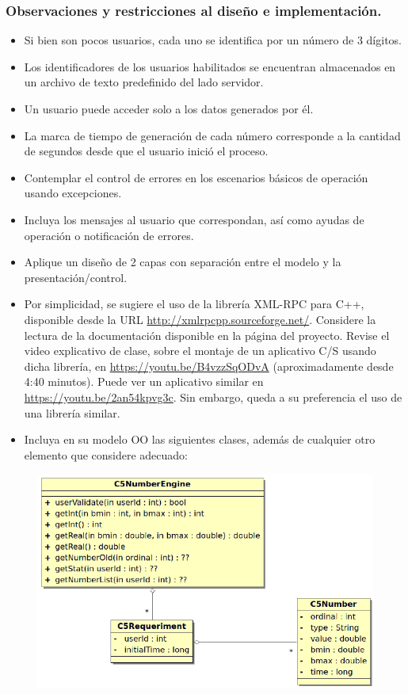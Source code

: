 \documentclass[a4paper,12pt]{article}
\begin{document}
\subsubsection{Observaciones y restricciones al diseño e implementación.}
\begin{itemize}
    \item Si bien son pocos usuarios, cada uno se identifica por un número de 3 dígitos.
    \item Los identificadores de los usuarios habilitados se encuentran almacenados en un archivo de texto predefinido del lado servidor.
    \item Un usuario puede acceder solo a los datos generados por él.
    \item La marca de tiempo de generación de cada número corresponde a la cantidad de segundos desde que el usuario inició el proceso.
    \item Contemplar el control de errores en los escenarios básicos de operación usando excepciones.
    \item Incluya los mensajes al usuario que correspondan, así como ayudas de operación o notificación de errores.
    \item Aplique un diseño de 2 capas con separación entre el modelo y la presentación/control.
    \item Por simplicidad, se sugiere el uso de la librería XML-RPC para C++, disponible desde la URL \url{http://xmlrpcpp.sourceforge.net/}. Considere la lectura de la documentación disponible en la página del proyecto. Revise el video explicativo de clase, sobre el montaje de un aplicativo C/S usando dicha librería, en \url{https://youtu.be/B4vzzSqODvA} (aproximadamente desde 4:40 minutos). Puede ver un aplicativo similar en \url{https://youtu.be/2an54kpvg3c}. Sin embargo, queda a su preferencia el uso de una librería similar.
    \item Incluya en su modelo OO las siguientes clases, además de cualquier otro elemento que considere adecuado:
\end{itemize}
\begin{figure}[!h]
        \centering
        \includegraphics[scale=0.5]{C5/Diagrama_de_Clases_C5.PNG}
\end{figure}
\end{document}
